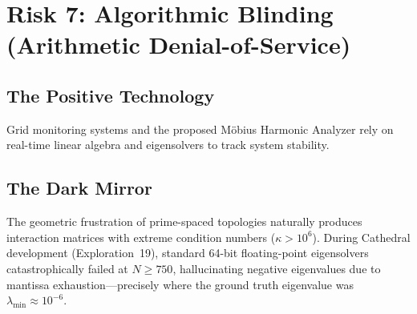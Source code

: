 \documentclass[11pt,a4paper]{article}
\begin{document}
\section{Risk 7: Algorithmic Blinding (Arithmetic Denial-of-Service)}
\label{sec:blinding}

\subsection{The Positive Technology}

Grid monitoring systems and the proposed M\"obius Harmonic Analyzer
rely on real-time linear algebra and eigensolvers to track system
stability.

\subsection{The Dark Mirror}

The geometric frustration of prime-spaced topologies naturally
produces interaction matrices with extreme condition numbers
($\kappa > 10^6$). During Cathedral development (Exploration~19),
standard 64-bit floating-point eigensolvers catastrophically failed
at $N \geq 750$, hallucinating negative eigenvalues due to mantissa
exhaustion---precisely where the ground truth eigenvalue was
$\lambda_{\min} \approx 10^{-6}$.
\end{document}
